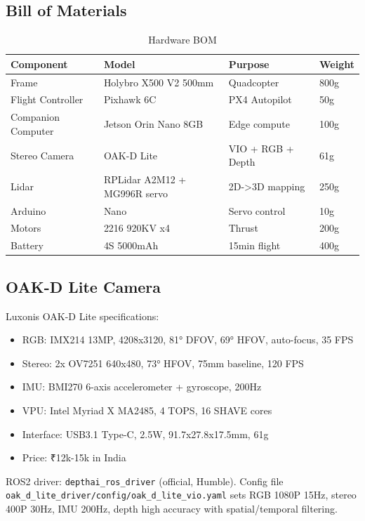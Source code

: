\documentclass[12pt,a4paper]{article}
\begin{document}
\subsection{Bill of Materials}

\begin{table}[H]
\centering
\begin{tabular}{@{}llll@{}}
\toprule
Component & Model & Purpose & Weight \\
\midrule
Frame & Holybro X500 V2 500mm & Quadcopter & 800g \\
Flight Controller & Pixhawk 6C & PX4 Autopilot & 50g \\
Companion Computer & Jetson Orin Nano 8GB & Edge compute & 100g \\
Stereo Camera & OAK-D Lite & VIO + RGB + Depth & 61g \\
Lidar & RPLidar A2M12 + MG996R servo & 2D->3D mapping & 250g \\
Arduino & Nano & Servo control & 10g \\
Motors & 2216 920KV x4 & Thrust & 200g \\
Battery & 4S 5000mAh & 15min flight & 400g \\
\bottomrule
\end{tabular}
\caption{Hardware BOM}
\end{table}

\subsection{OAK-D Lite Camera}
Luxonis OAK-D Lite specifications:
\begin{itemize}
    \item RGB: IMX214 13MP, 4208x3120, 81° DFOV, 69° HFOV, auto-focus, 35 FPS
    \item Stereo: 2x OV7251 640x480, 73° HFOV, 75mm baseline, 120 FPS
    \item IMU: BMI270 6-axis accelerometer + gyroscope, 200Hz
    \item VPU: Intel Myriad X MA2485, 4 TOPS, 16 SHAVE cores
    \item Interface: USB3.1 Type-C, 2.5W, 91.7x27.8x17.5mm, 61g
    \item Price: ₹12k-15k in India
\end{itemize}

ROS2 driver: \texttt{depthai\_ros\_driver} (official, Humble). Config file \texttt{oak\_d\_lite\_driver/config/oak\_d\_lite\_vio.yaml} sets RGB 1080P 15Hz, stereo 400P 30Hz, IMU 200Hz, depth high accuracy with spatial/temporal filtering.
\end{document}
